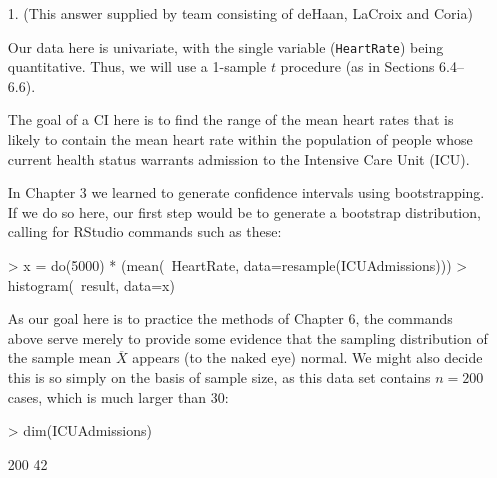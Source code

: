\documentclass{article}
\begin{document}
\begin{enumerate}
\item[1.]
(This answer supplied by team consisting of deHaan, LaCroix and Coria)

Our data here is univariate, with the single variable
(\texttt{HeartRate}) being quantitative.  Thus, we will use
a 1-sample $t$ procedure (as in Sections 6.4--6.6).

The goal of a CI here is to find the range of the mean heart rates that is likely to contain the mean heart rate within the
population of people whose current health status warrants
admission to the Intensive Care Unit (ICU).

In Chapter 3 we learned to generate confidence intervals
using bootstrapping.  If we do so here, our first step would
be to generate a bootstrap distribution, calling for RStudio
commands such as these:
\begin{Schunk}
\begin{Sinput}
> x = do(5000) * (mean(~HeartRate, data=resample(ICUAdmissions)))
> histogram(~result, data=x)
\end{Sinput}
\end{Schunk}
As our goal here is to practice the methods of Chapter 6, the
commands above serve merely to provide some evidence that the
sampling distribution of the sample mean $\overline X$ appears
(to the naked eye) normal.  We might also decide this is so
simply on the basis of sample size, as this data set contains
$n=200$ cases, which is much larger than 30:
\begin{Schunk}
\begin{Sinput}
> dim(ICUAdmissions)
\end{Sinput}
\begin{Soutput}
[1] 200  42
\end{Soutput}
\end{Schunk}


\end{enumerate}
\end{document}
